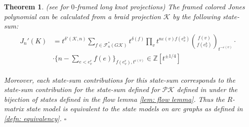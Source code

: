 \documentclass[11pt]{article}
\newtheorem{thm}{Theorem}[section]
\theoremstyle{definition}
\theoremstyle{remark}
\theoremstyle{remark}
\begin{document}
\begin{thm} (see \rm{\cite{GL}} for $0$-framed long knot projections) \label{thm:main}
The framed colored Jones polynomial can be calculated from a braid projection $\mathcal{K}$ by the following state-sum:
\begin{align}\label{eq=main formula}
\begin{split}
J_n'(K)&=t^{\delta '(\mathcal{K},n)}\sum_{f\in \mathcal{F}_{n}^*(G\mathcal{K})}t^{\delta (f)}
\prod_{v}t^{n\varepsilon (v)f(e_v^b)}{f(v) \choose f(e_v^b)}_{t^{-\varepsilon (v)}}\cdot \\ &
\cdot \{n-\sum_{e<e_v^r}f(e)\}_{f(e_v^r),t^{\varepsilon (v)}}
\in \mathbb{Z}[t^{\pm 1/4}]
\end{split}
\end{align}

\noindent Moreover, each state-sum contributions for this state-sum corresponds to the state-sum contribution for the state-sum defined for $\mathcal{P}\mathcal{K}$ defined in \cite{G} under the bijection of states defined in the flow lemma \ref{lem: flow lemma}.  Thus the  $R$-matrix state model \rm{\cite{GL}} is equivalent to the state models on arc graphs \rm{\cite{GL}} as defined in 
\ref{defn: equivalency}.  \hfill{$\square$}
\end{thm}
\end{document}
